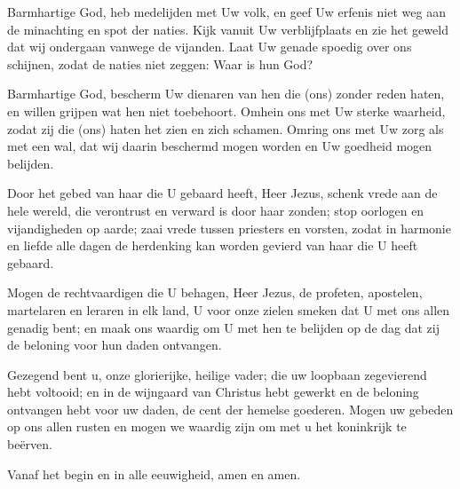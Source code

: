 \documentclass[12pt,twoside,a5paper]{article}
\begin{document}

\CLEARPAGEAV



\begin{halfparskip}
   Barmhartige God, heb medelijden met Uw volk, en geef Uw erfenis niet weg aan de minachting en spot der naties. Kijk vanuit Uw verblijfplaats en zie het geweld dat wij ondergaan vanwege de vijanden. Laat Uw genade spoedig over ons schijnen, zodat de naties niet zeggen: Waar is hun God?

  Barmhartige God, bescherm Uw dienaren van hen die (ons) zonder reden haten, en willen grijpen wat hen niet toebehoort. Omhein ons met Uw sterke waarheid, zodat zij die (ons) haten het zien en zich schamen. Omring ons met Uw zorg als met een wal, dat wij daarin beschermd mogen worden en Uw goedheid mogen belijden.

  Door het gebed van haar die U gebaard heeft, Heer Jezus, schenk vrede aan de hele wereld, die verontrust en verward is door haar zonden; stop oorlogen en  vijandigheden op aarde; zaai vrede tussen priesters en vorsten, zodat in harmonie en liefde alle dagen de herdenking kan worden gevierd van haar die U heeft gebaard.

  Mogen de rechtvaardigen die U behagen, Heer Jezus, de profeten, apostelen, martelaren en leraren in elk land, U voor onze zielen smeken dat U met ons allen genadig bent; en maak ons waardig om U met hen te belijden op de dag dat zij de beloning voor hun daden ontvangen.

  Gezegend bent u, onze glorierijke, heilige vader; die uw loopbaan zegevierend hebt voltooid; en in de wijngaard van Christus hebt gewerkt en de beloning ontvangen hebt voor uw daden, de cent der hemelse goederen. Mogen uw gebeden op ons allen rusten en mogen we waardig zijn om met u het koninkrijk te beërven.
\end{halfparskip}

\CLEARPAGEAV
{} Vanaf het begin en in alle eeuwigheid, amen en amen.
\end{document}
